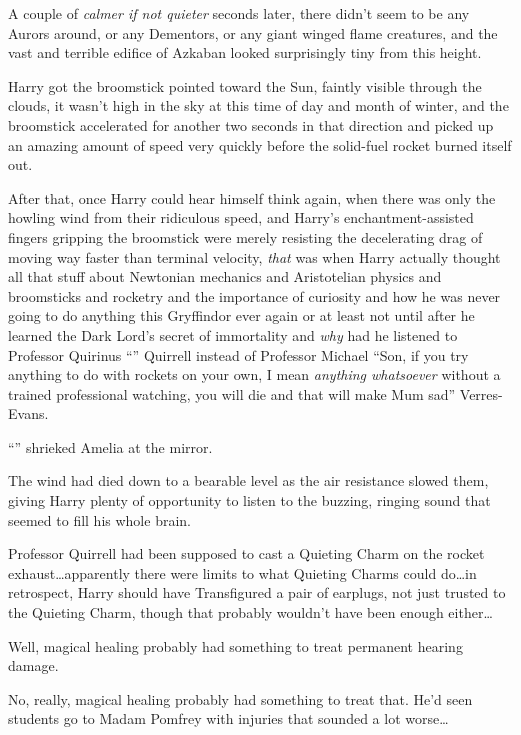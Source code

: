 A couple of \emph{calmer if not quieter} seconds later, there didn’t seem to be any Aurors around, or any Dementors, or any giant winged flame creatures, and the vast and terrible edifice of Azkaban looked surprisingly tiny from this height.

Harry got the broomstick pointed toward the Sun, faintly visible through the clouds, it wasn’t high in the sky at this time of day and month of winter, and the broomstick accelerated for another two seconds in that direction and picked up an amazing amount of speed very quickly before the solid-fuel rocket burned itself out.

After that, once Harry could hear himself think again, when there was only the howling wind from their ridiculous speed, and Harry’s enchantment-assisted fingers gripping the broomstick were merely resisting the decelerating drag of moving way faster than terminal velocity, \emph{that} was when Harry actually thought all that stuff about Newtonian mechanics and Aristotelian physics and broomsticks and rocketry and the importance of curiosity and how he was never going to do anything this Gryffindor ever again or at least not until after he learned the Dark Lord’s secret of immortality and \emph{why} had he listened to Professor Quirinus “” Quirrell instead of Professor Michael “Son, if you try anything to do with rockets on your own, I mean \emph{anything whatsoever} without a trained professional watching, you will die and that will make Mum sad” Verres-Evans.

\later

“” shrieked Amelia at the mirror.

\later

The wind had died down to a bearable level as the air resistance slowed them, giving Harry plenty of opportunity to listen to the buzzing, ringing sound that seemed to fill his whole brain.

Professor Quirrell had been supposed to cast a Quieting Charm on the rocket exhaust…apparently there were limits to what Quieting Charms could do…in retrospect, Harry should have Transfigured a pair of earplugs, not just trusted to the Quieting Charm, though that probably wouldn’t have been enough either…

Well, magical healing probably had something to treat permanent hearing damage.

No, really, magical healing probably had something to treat that. He’d seen students go to Madam Pomfrey with injuries that sounded a lot worse…

